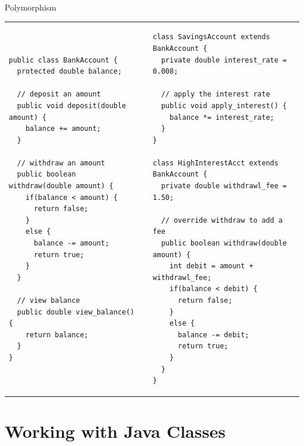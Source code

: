 \documentclass[aspectratio=169]{beamer}
\makeatletter
\newenvironment{splitslide}
{
\centering
\begin{tabular}{@{}m{0.50\textwidth} | m{0.025\textwidth}@{} m{0.4\textwidth}@{} m{0pt}@{}}
}
{
\end{tabular}
}
\makeatother
\begin{document}
\begin{frame}[fragile]{Polymorphism}
\begin{splitslide}

\begin{Verbatim}[fontsize=\tiny]
public class BankAccount {
  protected double balance;
  
  // deposit an amount
  public void deposit(double amount) {
    balance += amount;
  }
  
  // withdraw an amount
  public boolean withdraw(double amount) {
    if(balance < amount) {
      return false;
    }
    else {
      balance -= amount;
      return true;
    }
  }
  
  // view balance
  public double view_balance() {
    return balance;  
  }
}
\end{Verbatim}

&&

\begin{Verbatim}[fontsize=\tiny]
class SavingsAccount extends BankAccount {
  private double interest_rate = 0.008;
  
  // apply the interest rate
  public void apply_interest() {
    balance *= interest_rate;
  }
}

class HighInterestAcct extends BankAccount {
  private double withdrawl_fee = 1.50;
  
  // override withdraw to add a fee
  public boolean withdraw(double amount) {
    int debit = amount + withdrawl_fee;    
    if(balance < debit) {
      return false;
    }
    else {
      balance -= debit;
      return true;
    }
  }
}
\end{Verbatim}

\end{splitslide}
\end{frame}


\section{Working with Java Classes}
\end{document}
